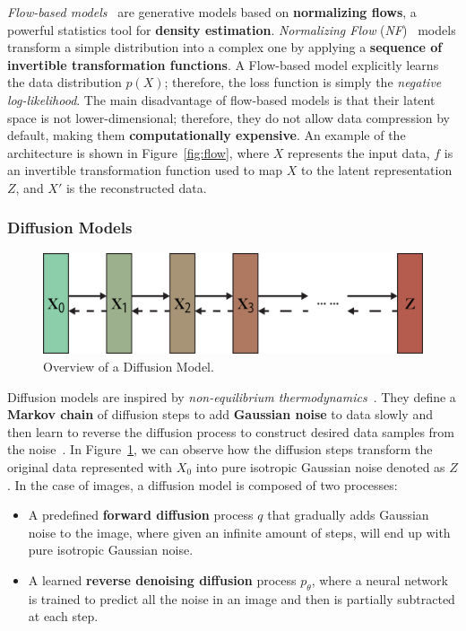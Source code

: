 \documentclass[preprint]{elsarticle}
\begin{document}
\emph{Flow-based models}~\cite{weng2018flow} are generative models based on \textbf{normalizing flows}, a powerful statistics tool for \textbf{density estimation}.
\emph{Normalizing Flow} (\emph{NF})~\cite{rezende2016variational} models transform a simple distribution into a complex one by applying a \textbf{sequence of invertible transformation functions}. 
A Flow-based model explicitly learns the data distribution $p(X)$; therefore, the loss function is simply the \emph{negative log-likelihood}.
The main disadvantage of flow-based models is that their latent space is not lower-dimensional;  therefore, they do not allow data compression by default, making them \textbf{computationally expensive}. An example of the architecture is shown in Figure~\ref{fig:flow}, where $X$ represents the input data, $f$ is an invertible transformation function used to map $X$ to the latent representation $Z$, and $X'$ is the reconstructed data.  


\subsubsection{Diffusion Models}\label{sec:diff}

\begin{figure}[t]
	\centering
    \includegraphics[scale=0.8]{img/svg/DIFF.png}
    \caption{Overview of a Diffusion Model.}\label{fig:diff-arch}
\end{figure}


Diffusion models are inspired by \emph{non-equilibrium thermodynamics}~\cite{V_n_2020}. 
They define a \textbf{Markov chain} of diffusion steps to add \textbf{Gaussian noise} to data slowly and then learn to reverse the diffusion process to construct desired data samples from the noise~\cite{weng2021diffusion}. 
In Figure~\ref{fig:diff-arch}, we can observe how the diffusion steps transform the original data represented with $X_0$ into pure isotropic Gaussian noise denoted as $Z$. 
In the case of images, a diffusion model is composed of two processes:

\begin{itemize}
	\item A predefined \textbf{forward diffusion} process $q$ that gradually adds Gaussian noise to the image, where given an infinite amount of steps, will end up with pure isotropic Gaussian noise. 
	\item A learned \textbf{reverse denoising diffusion} process $p_\theta$, where a neural network is trained to predict all the noise in an image and then is partially subtracted at each step.
\end{itemize}
\end{document}
